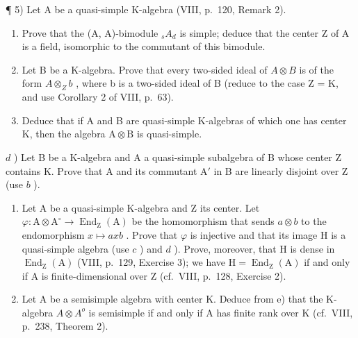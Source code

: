 ¶ 5) Let A be a quasi-simple K-algebra (VIII, p.~120, Remark 2).

\begin{enumerate}
\def\labelenumi{\alph{enumi})}
\item
  Prove that the (A, A)-bimodule \(_{s}A_{d}\) is simple; deduce that the center Z of A is a field, isomorphic to the commutant of this bimodule.
\item
  Let B be a K-algebra. Prove that every two-sided ideal of \(A \otimes B\) is of the form \(A \otimes_{Z} b\) , where b is a two-sided ideal of B (reduce to the case Z = K, and use Corollary 2 of VIII, p.~63).
\item
  Deduce that if A and B are quasi-simple K-algebras of which one has center K, then the algebra \(\mathrm{A} \otimes \mathrm{B}\) is quasi-simple.
\end{enumerate}

\(d\) ) Let B be a K-algebra and A a quasi-simple subalgebra of B whose center Z contains K. Prove that A and its commutant \(\mathrm{A}'\) in B are linearly disjoint over Z (use \(b\) ).

\begin{enumerate}
\def\labelenumi{\alph{enumi})}
\setcounter{enumi}{4}
\item
  Let A be a quasi-simple K-algebra and Z its center. Let \(\varphi : \mathrm{A} \otimes \mathrm{A}^{\circ} \to \operatorname{End}_{\mathrm{Z}}(\mathrm{A})\) be the homomorphism that sends \(a \otimes b\) to the endomorphism \(x \mapsto axb\) . Prove that \(\varphi\) is injective and that its image H is a quasi-simple algebra (use \(c\) ) and \(d\) ). Prove, moreover, that H is dense in \(\operatorname{End}_{\mathrm{Z}}(\mathrm{A})\) (VIII, p.~129, Exercise 3); we have \(\mathrm{H} = \operatorname{End}_{\mathrm{Z}}(\mathrm{A})\) if and only if A is finite-dimensional over Z (cf.~VIII, p.~128, Exercise 2).
\item
  Let A be a semisimple algebra with center K. Deduce from e) that the K-algebra \(A \otimes A^{o}\) is semisimple if and only if A has finite rank over K (cf.~VIII, p.~238, Theorem 2).
\end{enumerate}

